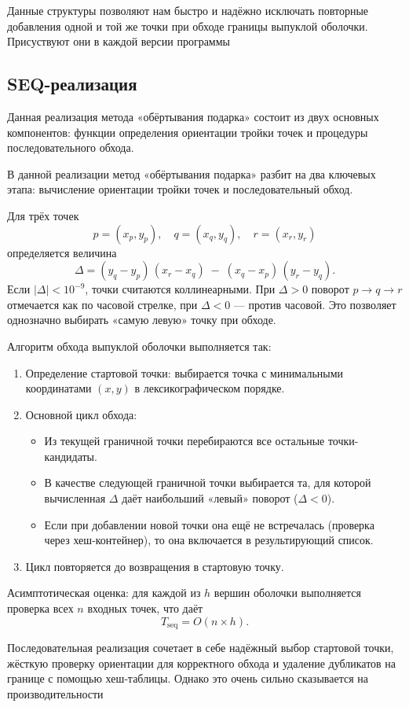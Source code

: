 \documentclass[12pt,a4paper]{article}
\begin{document}
Данные структуры позволяют нам быстро и надёжно исключать повторные добавления одной и той же точки при обходе границы выпуклой оболочки. Присуствуют они в каждой версии программы

\subsection*{SEQ-реализация}
Данная реализация метода «обёртывания подарка» состоит из двух основных компонентов: функции определения ориентации тройки точек и процедуры последовательного обхода.

В данной реализации метод «обёртывания подарка» разбит на два ключевых этапа: вычисление ориентации тройки точек и последовательный обход.

Для трёх точек 
\[
p=(x_p,y_p),\quad q=(x_q,y_q),\quad r=(x_r,y_r)
\]
определяется величина
\[
\Delta = (y_q - y_p)\,(x_r - x_q)\;-\;(x_q - x_p)\,(y_r - y_q).
\]
Если \(|\Delta| < 10^{-9}\), точки считаются коллинеарными. При \(\Delta>0\) поворот \(p \to q \to r\) отмечается как по часовой стрелке, при \(\Delta<0\) — против часовой. Это позволяет однозначно выбирать «самую левую» точку при обходе.

Алгоритм обхода выпуклой оболочки выполняется так:
\begin{enumerate}
  \item Определение стартовой точки: выбирается точка с минимальными координатами \((x,y)\) в лексикографическом порядке.
  \item Основной цикл обхода:
    \begin{itemize}
      \item Из текущей граничной точки перебираются все остальные точки-кандидаты.
      \item В качестве следующей граничной точки выбирается та, для которой вычисленная \(\Delta\) даёт наибольший «левый» поворот (\(\Delta<0\)).
      \item Если при добавлении новой точки она ещё не встречалась (проверка через хеш‑контейнер), то она включается в результирующий список.
    \end{itemize}
  \item Цикл повторяется до возвращения в стартовую точку.
\end{enumerate}

Асимптотическая оценка: для каждой из \(h\) вершин оболочки выполняется проверка всех \(n\) входных точек, что даёт  
\[
T_{\mathrm{seq}} = O(n \times h).
\] 

Последовательная реализация сочетает в себе надёжный выбор стартовой точки, жёсткую проверку ориентации для корректного обхода и удаление дубликатов на границе с помощью хеш‑таблицы. Однако это очень сильно сказывается на производительности
\end{document}
